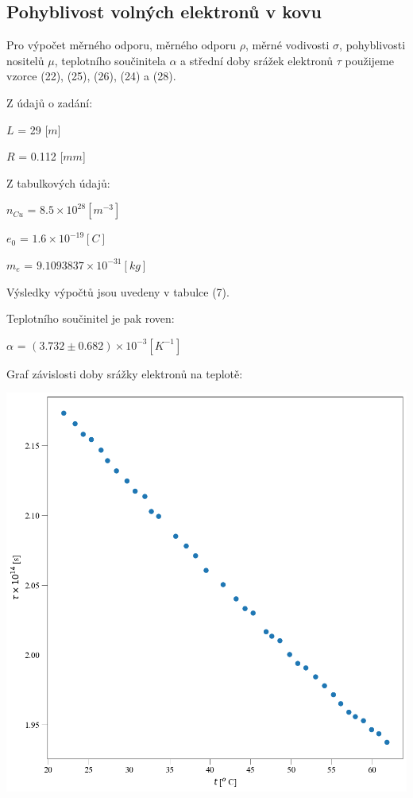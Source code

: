 \documentclass[a4paper,11pt]{article}
\begin{document}
\begin{minipage}[t]{0.5\textwidth}
    \subsection{Pohyblivost volných elektronů v kovu}
        Pro výpočet měrného odporu, měrného odporu $\rho$, měrné vodivosti $\sigma$, pohyblivosti nositelů $\mu$, teplotního součinitela $\alpha$ a střední doby srážek elektronů $\tau$ použijeme vzorce (22), (25), (26), (24) a (28).
        \par Z údajů o zadání: 
        \begin{center}
            $L$ = 29 [$m$]
            \par $R$ = 0.112 [$mm$]
        \end{center}
         Z tabulkových údajů: 
        \begin{center}
            $n_{Cu}$ = $8.5 \times 10^{28} [m^{-3}]$
            \par $e_0$ = $1.6 \times 10^{-19} [C]$
            \par $m_e$ = $9.1093837 \times 10^{-31} [kg]$
        \end{center}
        Výsledky výpočtů jsou uvedeny v tabulce (7).
        \vspace{20pt}
        \par Teplotního součinitel je pak roven:
        \begin{center}
            $\alpha$ = $(3.732 \pm 0.682) \times 10^{-3} [K^{-1}]$
        \end{center}
        Graf závislosti doby srážky elektronů na teplotě: 
        \vspace{20pt}
        \par \centering
        \includegraphics[scale=0.3]{tau}
        \captionsetup{justification=centering, font=footnotesize}
        \label{fig:Graf závislosti doby srážky elektronů na teplotě:}
        \vspace{10pt}
        \raggedright
    \end{minipage}
\end{document}
